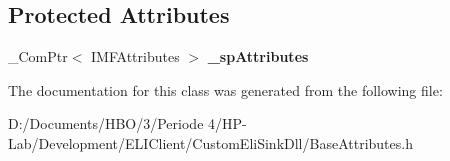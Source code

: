 \subsection*{Protected Attributes}
\begin{DoxyCompactItemize}
\item 
\mbox{\label{class_c_base_attributes_a385ac60efcb5f8a4c20fd158f52f45f7}} 
\+\_\+\+Com\+Ptr$<$ I\+M\+F\+Attributes $>$ {\bfseries \+\_\+sp\+Attributes}
\end{DoxyCompactItemize}


The documentation for this class was generated from the following file\+:\begin{DoxyCompactItemize}
\item 
D\+:/\+Documents/\+H\+B\+O/3/\+Periode 4/\+H\+P-\/\+Lab/\+Development/\+E\+L\+I\+Client/\+Custom\+Eli\+Sink\+Dll/Base\+Attributes.\+h\end{DoxyCompactItemize}
